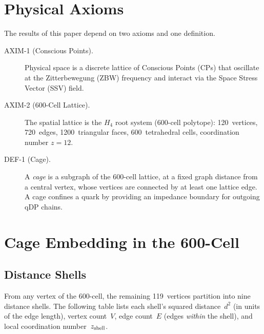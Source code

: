 \documentclass[11pt,letterpaper]{article}
\begin{document}
\section{Physical Axioms}
\label{sec:axioms}

The results of this paper depend on two axioms and one definition.

\begin{description}
\item[AXIM-1 (Conscious Points).] Physical space is a discrete
  lattice of Conscious Points (CPs) that oscillate at the
  Zitterbewegung (ZBW) frequency and interact via the Space
  Stress Vector (SSV) field.

\item[AXIM-2 (600-Cell Lattice).] The spatial lattice is the
  $H_4$ root system (600-cell polytope): 120~vertices,
  720~edges, 1200~triangular faces, 600~tetrahedral cells,
  coordination number $z = 12$.

\item[DEF-1 (Cage).] A \emph{cage} is a subgraph of the 600-cell
  lattice, at a fixed graph distance from a central vertex, whose
  vertices are connected by at least one lattice edge.  A cage
  confines a quark by providing an impedance boundary for outgoing
  qDP chains.
\end{description}

\section{Cage Embedding in the 600-Cell}
\label{sec:embedding}

\subsection{Distance Shells}

From any vertex of the 600-cell, the remaining 119~vertices
partition into nine distance shells.  The following table lists
each shell's squared distance~$d^2$ (in units of the edge length),
vertex count~$V$, edge count~$E$ (edges \emph{within} the shell),
and local coordination number~$z_{\rm shell}$.
\end{document}
